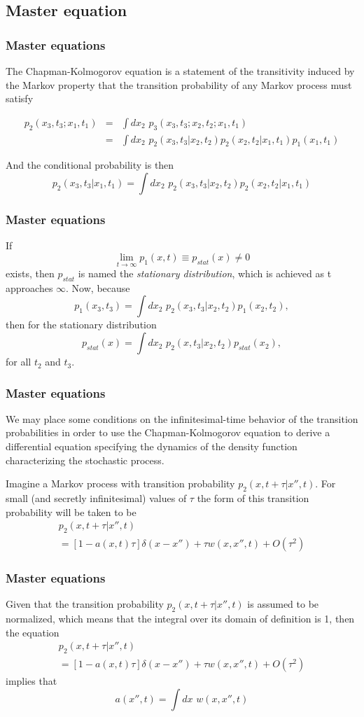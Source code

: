 \subsection{Master equation}
\begin{frame}
\frametitle{Master equations}

The Chapman-Kolmogorov equation is a statement of the transitivity induced by the Markov property that the transition probability of any Markov process must satisfy 

\begin{eqnarray*}
p_2(x_3,t_3;x_1,t_1) &=& \int dx_2 \,\, p_3(x_3,t_3;x_2,t_2;x_1,t_1)\\
					&=& \int dx_2 \,\, p_2(x_3,t_3|x_2,t_2)p_2(x_2,t_2|x_1,t_1)p_1(x_1,t_1)
\end{eqnarray*}

And the conditional probability is then
$$
p_2(x_3,t_3|x_1,t_1) = \int dx_2 \,\, p_2(x_3,t_3|x_2,t_2)p_2(x_2,t_2|x_1,t_1)
$$
\end{frame}

\begin{frame}
\frametitle{Master equations}
If 
$$
\lim_{t \rightarrow \infty} p_1(x,t) \equiv p_{stat}(x) \neq 0
$$
exists, then $p_{stat}$ is named the \emph{stationary distribution}, which is achieved as t approaches $\infty$. Now, because
$$
p_1(x_3,t_3) = \int dx_2 \,\, p_2(x_3,t_3|x_2,t_2)p_1(x_2,t_2),
$$
then for the stationary distribution
$$
p_{stat}(x) = \int dx_2 \,\, p_2(x,t_3|x_2,t_2)p_{stat}(x_2),
$$
for all $t_2$ and $t_3$.
\end{frame}

\begin{frame}
\frametitle{Master equations}
We may place some conditions on the infinitesimal-time behavior of the transition probabilities in order to use the Chapman-Kolmogorov equation to derive a differential equation specifying the dynamics of the density function characterizing the stochastic process.

Imagine a Markov process with transition probability $p_2(x,t+\tau|x'',t)$. For small (and secretly infinitesimal) values of $\tau$ the form of this transition probability will be taken to be
\begin{multline*}
p_2(x,t+\tau|x'',t)\\
= [1-a(x,t)\tau] \delta(x-x'') + \tau w (x,x'',t) + O(\tau^2)
\end{multline*}
\end{frame}

\begin{frame}
\frametitle{Master equations}
Given that the transition probability $p_2(x,t+\tau|x'',t)$ is assumed to be normalized, which means that the integral over its domain of definition is 1, then the equation 
\begin{multline*}
p_2(x,t+\tau|x'',t)\\
= [1-a(x,t)\tau] \delta(x-x'') + \tau w (x,x'',t) + O(\tau^2)
\end{multline*}
implies that
$$
a(x'',t)=\int dx \,\, w(x,x'',t)
$$
\end{frame}


